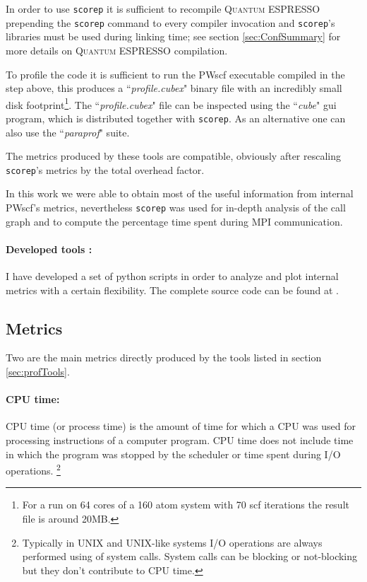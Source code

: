 \documentclass[a4paper,12pt]{article}
\newcommand\QE{\textsc{Quantum} ESPRESSO }
\begin{document}
In order to use \texttt{scorep} it is sufficient to recompile \QE prepending the \texttt{scorep} command to every compiler invocation and  \texttt{scorep}'s libraries must be used during linking time; see section \ref{sec:ConfSummary} for more details on \QE compilation.

To profile the code it is sufficient to run the PWscf executable compiled in the step above, this produces a ``\textit{profile.cubex}" binary file with an incredibly small disk footprint\footnote{For a run on 64 cores of a 160 atom system with 70 scf iterations the result file is around 20MB.}.
The ``\textit{profile.cubex}" file can be inspected using the ``\textit{cube}" gui program, which is distributed together with \texttt{scorep}. As an alternative one can also use the ``\textit{paraprof}" suite.

The metrics produced by these tools are compatible, obviously after rescaling \texttt{scorep}'s metrics by the total overhead factor.

In this work we were able to obtain most of the useful information from internal PWscf's metrics, nevertheless \texttt{scorep} was used for in-depth analysis of the call graph and to compute the percentage time spent during MPI communication.

\paragraph{Developed tools :} I have developed a set of python scripts in order to analyze and plot internal metrics with a certain flexibility. The complete source code can be found at \cite{qetools}.


\subsection{Metrics}\label{sec:Metrics}
Two are the main metrics directly produced by the tools listed in section \ref{sec:profTools}.

\paragraph{CPU time: } CPU time (or process time) is the amount of time for which a CPU was used for processing instructions of a computer program. CPU time does not include time in which the program was stopped by the scheduler or time spent during I/O operations. \footnote{Typically in UNIX and UNIX-like systems I/O operations are always performed using of system calls. System calls can be blocking or not-blocking but they don't contribute to CPU time.}
\end{document}
